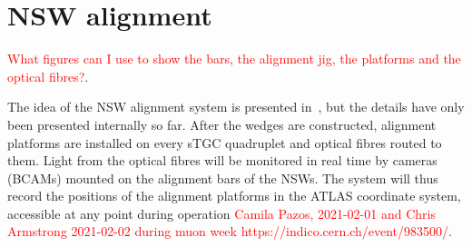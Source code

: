 \section{NSW alignment}
\label{sec:nsw_alignment}

\textcolor{red}{What figures can I use to show the bars, the alignment jig, the platforms and the optical fibres?}.

The idea of the NSW alignment system is presented in~\cite{nsw_tdr}, but the details have only been presented internally so far. After the wedges are constructed, alignment platforms are installed on every sTGC quadruplet and optical fibres routed to them. Light from the optical fibres will be monitored in real time by cameras (BCAMs) mounted on the alignment bars of the NSWs. The system will thus record the positions of the alignment platforms in the ATLAS coordinate system, accessible at any point during operation \textcolor{red}{Camila Pazos, 2021-02-01 and Chris Armstrong 2021-02-02 during muon week https://indico.cern.ch/event/983500/}. %


